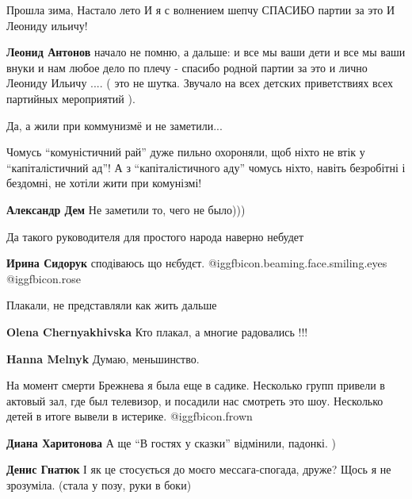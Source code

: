 \begin{itemize}

\obeycr
Прошла зима,
Настало лето
И я с волнением шепчу
СПАСИБО партии за это
И Леониду ильичу!
\restorecr

\begin{itemize} %
\textbf{Леонид Антонов} начало не помню, а дальше: и все мы ваши дети и все мы ваши внуки и нам любое дело по плечу - спасибо родной партии за это и лично Леониду Ильичу .... ( это не шутка. Звучало на всех детских приветствиях всех партийных мероприятий ).
\end{itemize} %

Да, а жили при коммунизмё и не заметили...

\begin{itemize} %

Чомусь \enquote{комуністичний рай} дуже пильно охороняли, щоб ніхто не втік у \enquote{капіталістичний ад}!
А з \enquote{капіталістичного аду} чомусь ніхто, навіть безробітні і бездомні, не хотіли жити при комунізмі!

\textbf{Александр Дем} Не заметили то, чего не было)))
\end{itemize} %

Да такого руководителя для простого народа наверно небудет

\textbf{Ирина Сидорук} сподіваюсь що нєбудєт.  @igg{fbicon.beaming.face.smiling.eyes}  @igg{fbicon.rose} 

Плакали, не представляли как жить дальше

\begin{itemize} %
\textbf{Olena Chernyakhivska} Кто плакал, а многие радовались !!!

\textbf{Hanna Melnyk} Думаю, меньшинство.
\end{itemize} %


На момент смерти Брежнева я была еще в садике. Несколько групп привели в
актовый зал, где был телевизор, и посадили нас смотреть это шоу. Несколько
детей в итоге вывели в истерике.  @igg{fbicon.frown} 

\begin{itemize} %
\textbf{Диана Харитонова} А ще \enquote{В гостях у сказки} відмінили, падонкі. )

\textbf{Денис Гнатюк} І як це стосується до моєго мессага-спогада, друже? Щось я не зрозуміла. (стала у позу, руки в боки)


\end{itemize}
\end{itemize}
